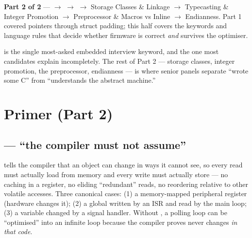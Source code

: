 
\begin{partnote}
\textbf{Part 2 of 2} ---  $\rightarrow$ 
$\rightarrow$  $\rightarrow$ Storage Classes \& Linkage
$\rightarrow$ Typecasting \& Integer Promotion $\rightarrow$ Preprocessor \&
Macros vs Inline $\rightarrow$ Endianness. Part 1 covered pointers through
struct padding; this half covers the keywords and language rules that decide
whether firmware is correct \emph{and} survives the optimiser.
\end{partnote}

 is the single most-asked embedded interview keyword, and the
one most candidates explain incompletely. The rest of Part 2 --- storage
classes, integer promotion, the preprocessor, endianness --- is where senior
panels separate ``wrote some C'' from ``understands the abstract machine.''

\section{Primer (Part 2)}

\subsection{ --- ``the compiler must not assume''}

 tells the compiler that an object can change in ways it cannot
see, so every read must actually load from memory and every write must
actually store --- no caching in a register, no eliding ``redundant'' reads,
no reordering relative to other volatile accesses. Three canonical cases:
(1) a memory-mapped peripheral register (hardware changes it);
(2) a global written by an ISR and read by the main loop;
(3) a variable changed by a signal handler. Without , a
 polling loop can be ``optimised'' into an infinite
loop because the compiler proves  never changes \emph{in that
code}.

